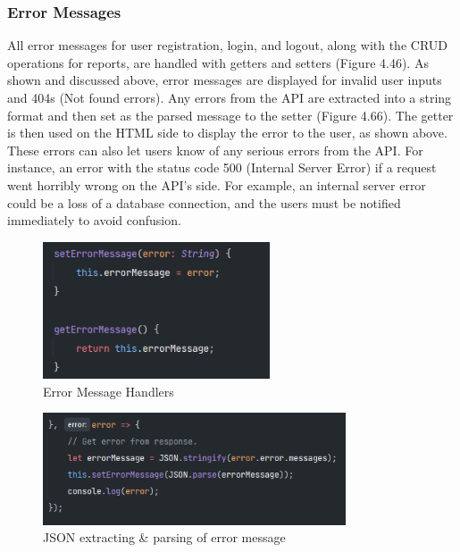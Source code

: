 \subsubsection{Error Messages}
All error messages for user registration, login, and logout, along with the CRUD operations for reports, are handled with getters and setters (Figure 4.46). As shown and discussed above, error messages are displayed for invalid user inputs and 404s (Not found errors). Any errors from the API are extracted into a string format and then set as the parsed message to the setter (Figure 4.66). The getter is then used on the HTML side to display the error to the user, as shown above. These errors can also let users know of any serious errors from the API. For instance, an error with the status code 500 (Internal Server Error) if a request went horribly wrong on the API's side. For example, an internal server error could be a loss of a database connection, and the users must be notified immediately to avoid confusion.

\begin{figure}[H]
    \centering
    \caption{Error Message Handlers}
    \label{image:errorMessageHandlers}
    \includegraphics[width=0.6\textwidth]{images/repota/report_pages/error_handlers.png}
\end{figure}

\begin{figure}[H]
    \centering
    \caption{JSON extracting \& parsing of error message}
    \label{image:letError}
    \includegraphics[width=0.8\textwidth]{images/repota/report_pages/let_error.png}
\end{figure}


